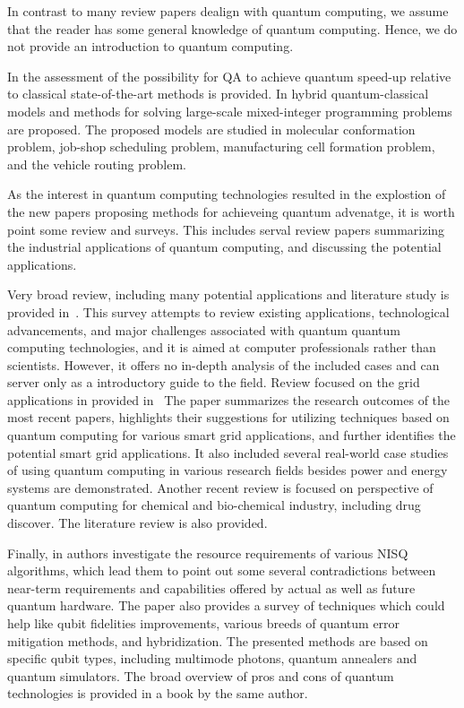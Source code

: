 \documentclass[a4paper,11pt]{article}
\begin{document}
In contrast to many review papers dealign with quantum computing, we assume that the reader has some general knowledge of quantum computing. Hence, we do not provide an introduction to quantum computing.

In \cite{crosson2021prospects} the assessment of the possibility for QA to 
achieve quantum speed-up relative to classical state-of-the-art methods is provided. In \cite{ajagekar2020quantum} hybrid quantum-classical models and methods for solving large-scale mixed-integer programming problems are proposed. The proposed models are studied in molecular conformation problem, job-shop scheduling problem, manufacturing cell formation
problem, and the vehicle routing problem.

As the interest in quantum computing technologies resulted in the explostion of the new papers proposing methods for achieveing quantum advenatge, it is worth point some review and surveys. This includes serval review papers summarizing the industrial applications of quantum computing, and discussing the potential applications.

Very broad review, including many potential applications and literature study is provided in~\cite{singh2023contemporary}. This survey attempts to review existing applications, technological advancements, and major challenges associated with quantum quantum computing technologies, and it is aimed at computer professionals rather than scientists. However, it offers no in-depth analysis of the included cases and can server only as a introductory guide to the field.
Review focused on the grid applications in provided in~\cite{ullah2022quantum} The paper summarizes the research outcomes of the most recent papers, highlights their suggestions for utilizing techniques based on quantum computing for various smart grid applications, and further identifies the potential smart grid applications. It also included several real-world case studies of using quantum computing in various research fields besides power and energy systems are demonstrated.
Another recent review \cite{nourbakhsh2022quantum} is focused on perspective of quantum computing for chemical and bio-chemical industry, including drug discover. The literature review is also provided.

Finally, in \cite{ezratty2023where} authors investigate the resource requirements of various NISQ algorithms, which lead them to point out some several contradictions between near-term requirements and capabilities offered by actual as well as future quantum hardware. The paper also provides a survey of techniques which could help like qubit fidelities improvements, various breeds of quantum error mitigation methods, and hybridization. The presented methods are based on specific qubit types, including multimode photons, quantum annealers and quantum simulators. The broad overview of pros and cons of quantum technologies is provided in a book \cite{ezratty2021understanding} by the same author.
\end{document}
